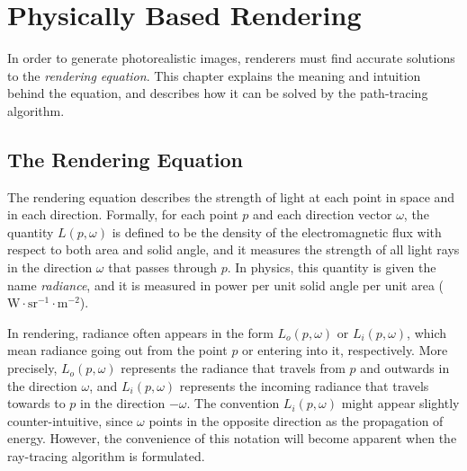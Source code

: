 \chapter{Physically Based Rendering}

In order to generate photorealistic images, renderers must find accurate solutions to the \textit{rendering equation}. This chapter explains the meaning and intuition behind the equation, and describes how it can be solved by the path-tracing algorithm.

\section{The Rendering Equation}

The rendering equation describes the strength of light at each point in space and in each direction. Formally, for each point $p$ and each direction vector $\omega$, the quantity $L(p,\omega)$ is defined to be the density of the electromagnetic flux with respect to both area and solid angle, and it measures the strength of all light rays in the direction $\omega$ that passes through $p$. In physics, this quantity is given the name \textit{radiance}, and it is measured in power per unit solid angle per unit area ($\text{W}\cdot \text{sr}^{-1}\cdot\text{m}^{-2}$).

In rendering, radiance often appears in the form $L_o(p,\omega)$ or $L_i(p,\omega)$, which mean radiance going out from the point $p$ or entering into it, respectively. More precisely, $L_o(p,\omega)$ represents the radiance that travels from $p$ and outwards in the direction $\omega$, and $L_i(p,\omega)$ represents the incoming radiance that travels towards to $p$ in the direction $-\omega$. The convention $L_i(p,\omega)$ might appear slightly counter-intuitive, since $\omega$ points in the opposite direction as the propagation of energy. However, the convenience of this notation will become apparent when the ray-tracing algorithm is formulated. 


